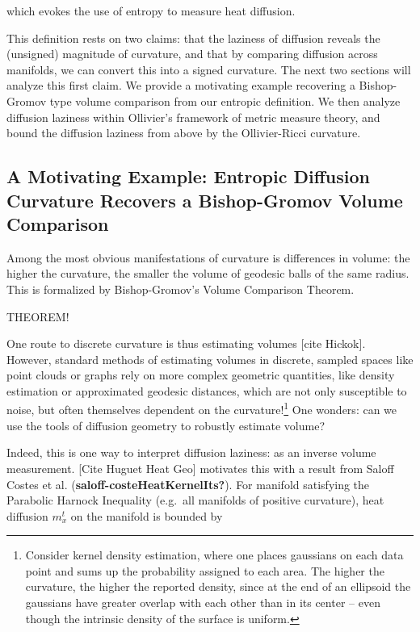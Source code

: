 \documentclass[
  letterpaper,
  DIV=11,
  numbers=noendperiod]{scrartcl}
\theoremstyle{plain}
\theoremstyle{plain}
\theoremstyle{definition}
\theoremstyle{definition}
\theoremstyle{remark}
\begin{document}
which evokes the use of entropy to measure heat diffusion.

This definition rests on two claims: that the laziness of diffusion
reveals the (unsigned) magnitude of curvature, and that by comparing
diffusion across manifolds, we can convert this into a signed curvature.
The next two sections will analyze this first claim. We provide a
motivating example recovering a Bishop-Gromov type volume comparison
from our entropic definition. We then analyze diffusion laziness within
Ollivier's framework of metric measure theory, and bound the diffusion
laziness from above by the Ollivier-Ricci curvature.

\subsection{A Motivating Example: Entropic Diffusion Curvature Recovers
a Bishop-Gromov Volume
Comparison}\label{a-motivating-example-entropic-diffusion-curvature-recovers-a-bishop-gromov-volume-comparison}

Among the most obvious manifestations of curvature is differences in
volume: the higher the curvature, the smaller the volume of geodesic
balls of the same radius. This is formalized by Bishop-Gromov's Volume
Comparison Theorem.

THEOREM!

One route to discrete curvature is thus estimating volumes {[}cite
Hickok{]}. However, standard methods of estimating volumes in discrete,
sampled spaces like point clouds or graphs rely on more complex
geometric quantities, like density estimation or approximated geodesic
distances, which are not only susceptible to noise, but often themselves
dependent on the curvature!\footnote{Consider kernel density estimation,
  where one places gaussians on each data point and sums up the
  probability assigned to each area. The higher the curvature, the
  higher the reported density, since at the end of an ellipsoid the
  gaussians have greater overlap with each other than in its center --
  even though the intrinsic density of the surface is uniform.} One
wonders: can we use the tools of diffusion geometry to robustly estimate
volume?

Indeed, this is one way to interpret diffusion laziness: as an inverse
volume measurement. {[}Cite Huguet Heat Geo{]} motivates this with a
result from Saloff Costes et al. (\textbf{saloff-costeHeatKernelIts?}).
For manifold satisfying the Parabolic Harnock Inequality (e.g.~all
manifolds of positive curvature), heat diffusion \(m_{x}^t\) on the
manifold is bounded by
\end{document}
